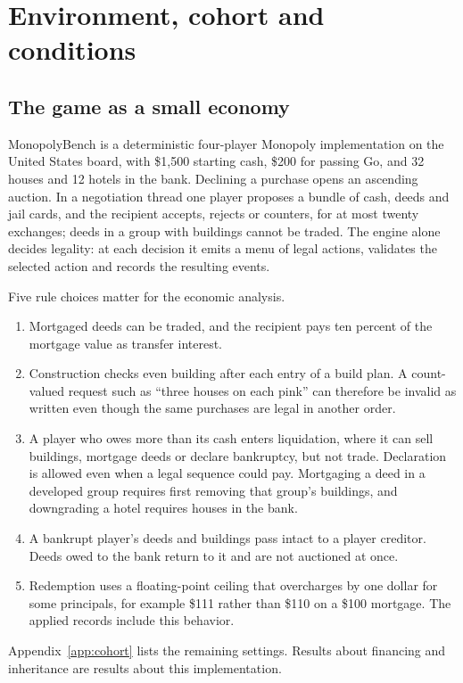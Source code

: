 \section{Environment, cohort and conditions}
\label{sec:setup}

\subsection{The game as a small economy}
\label{sec:rules}

MonopolyBench is a deterministic four-player Monopoly implementation on the United States board, with \$1,500 starting cash, \$200 for passing Go, and 32 houses and 12 hotels in the bank. Declining a purchase opens an ascending auction. In a negotiation thread one player proposes a bundle of cash, deeds and jail cards, and the recipient accepts, rejects or counters, for at most twenty exchanges; deeds in a group with buildings cannot be traded. The engine alone decides legality: at each decision it emits a menu of legal actions, validates the selected action and records the resulting events.

Five rule choices matter for the economic analysis.
\begin{enumerate}
\item Mortgaged deeds can be traded, and the recipient pays ten percent of the mortgage value as transfer interest.
\item Construction checks even building after each entry of a build plan. A count-valued request such as ``three houses on each pink'' can therefore be invalid as written even though the same purchases are legal in another order.
\item A player who owes more than its cash enters liquidation, where it can sell buildings, mortgage deeds or declare bankruptcy, but not trade. Declaration is allowed even when a legal sequence could pay. Mortgaging a deed in a developed group requires first removing that group's buildings, and downgrading a hotel requires houses in the bank.
\item A bankrupt player's deeds and buildings pass intact to a player creditor. Deeds owed to the bank return to it and are not auctioned at once.
\item Redemption uses a floating-point ceiling that overcharges by one dollar for some principals, for example \$111 rather than \$110 on a \$100 mortgage. The applied records include this behavior.
\end{enumerate}
Appendix~\ref{app:cohort} lists the remaining settings. Results about financing and inheritance are results about this implementation.

